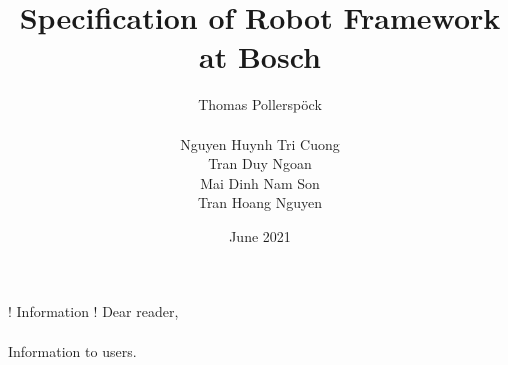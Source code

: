 \documentclass[a4paper,10pt]{report}
\begin{document}
\author{Thomas Pollerspöck \\ \\ Nguyen Huynh Tri Cuong \\ Tran Duy Ngoan \\ Mai Dinh Nam Son \\ Tran Hoang Nguyen}
\title{Specification of Robot Framework at Bosch}
\date{June 2021}


\maketitle

\begin{boxinfo}{! Information !}{
Dear reader, \\
\\
Information to users.
}
\end{boxinfo}

\tableofcontents

\listoftodos







\end{document}
